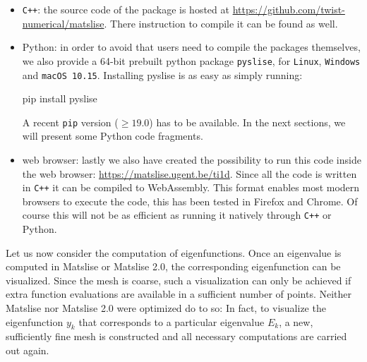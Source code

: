 \begin{itemize}
  \item \texttt{C++}: the source code of the package is hosted at \url{https://github.com/twist-numerical/matslise}. There instruction to compile it can be found as well.

  \item Python: in order to avoid that users need to compile the packages themselves, we also provide a 64-bit prebuilt python package \texttt{pyslise}, for \texttt{Linux}, \texttt{Windows} and \texttt{macOS 10.15}. Installing pyslise is as easy as simply running:
        \begin{python}
pip install pyslise
\end{python}

        A recent \texttt{pip} version ($\geq 19.0$) has to be available. In the next sections, we will present some Python code fragments.

  \item web browser:
        lastly we also have created the possibility to run this code inside the web browser: \url{https://matslise.ugent.be/ti1d}. Since all the code is written in \texttt{C++} it can be compiled to WebAssembly. This format enables most modern browsers to execute the code, this has been tested in Firefox and Chrome. Of course this will not be as efficient as running it natively through \texttt{C++} or Python.

\end{itemize}


Let us now consider the computation of eigenfunctions.
Once an eigenvalue is computed in Matslise or Matslise 2.0, the corresponding eigenfunction can be visualized. Since the mesh is coarse, such a visualization can only be achieved if extra function evaluations are available in a sufficient number of points. Neither Matslise nor Matslise 2.0 were optimized do to so: In fact, to visualize the eigenfunction $y_k$ that corresponds to a particular eigenvalue $E_k$, a new, sufficiently fine mesh is constructed and all necessary computations are carried out again.

